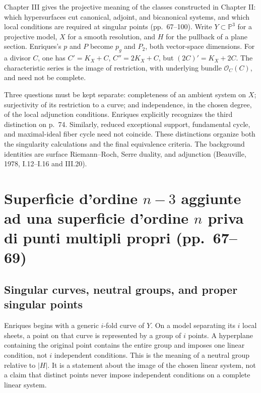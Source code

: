 Chapter III gives the projective meaning of the classes constructed in Chapter II: which hypersurfaces cut canonical, adjoint, and bicanonical systems, and which local conditions are required at singular points (pp.~67--100). Write \(Y\subset\mathbb P^3\) for a projective model, \(X\) for a smooth resolution, and \(H\) for the pullback of a plane section. Enriques's \(p\) and \(P\) become \(p_g\) and \(P_2\), both vector-space dimensions. For a divisor \(C\), one has \(C'=K_X+C\), \(C''=2K_X+C\), but \((2C)'=K_X+2C\). The characteristic series is the image of restriction, with underlying bundle \(\mathcal O_C(C)\), and need not be complete.

Three questions must be kept separate: completeness of an ambient system on \(X\); surjectivity of its restriction to a curve; and independence, in the chosen degree, of the local adjunction conditions. Enriques explicitly recognizes the third distinction on p.~74. Similarly, reduced exceptional support, fundamental cycle, and maximal-ideal fiber cycle need not coincide. These distinctions organize both the singularity calculations and the final equivalence criteria. The background identities are surface Riemann--Roch, Serre duality, and adjunction (Beauville, 1978, I.12--I.16 and III.20).

\section[Superficie aggiunte di ordine n-3]{\texorpdfstring{Superficie d'ordine \(n-3\) aggiunte ad una superficie d'ordine \(n\) priva di punti multipli propri (pp.~67--69)}{Superficie d'ordine n-3 aggiunte ad una superficie d'ordine n priva di punti multipli propri (pp.~67--69)}}\label{commentary-III-1}

\subsection{Singular curves, neutral groups, and proper singular points}

Enriques begins with a generic \(i\)-fold curve of \(Y\). On a model separating its \(i\) local sheets, a point on that curve is represented by a group of \(i\) points. A hyperplane containing the original point contains the entire group and imposes one linear condition, not \(i\) independent conditions. This is the meaning of a neutral group relative to \(|H|\). It is a statement about the image of the chosen linear system, not a claim that distinct points never impose independent conditions on a complete linear system.


